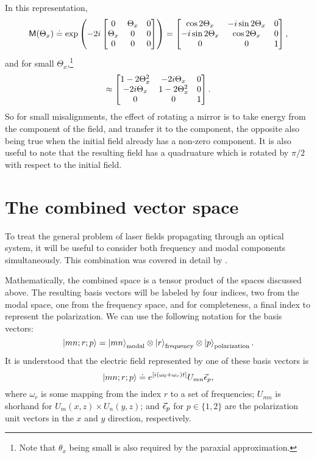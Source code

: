 In this representation, 
\begin{equation}
\mathsf{M}(\Theta_x) \doteq \exp \left( -2i 
\left[\begin{matrix} 
0 & \Theta_x & 0 \\
\Theta_x & 0 & 0 \\
0 & 0 & 0 
\end{matrix}\right]
\right)
=
\left[\begin{matrix}
\cos {2\Theta_x} & -i\sin{2\Theta_x}& 0 \\
-i\sin {2\Theta_x} & \cos{2\Theta_x}& 0 \\
0 & 0 & 1 \\
\end{matrix}\right] ,
\end{equation}
and for small $\Theta_x$,\footnote{Note that $\theta_x$ being small is also required by the paraxial approximation.}
\[
\approx
\left[\begin{matrix}
1-2\Theta_x^2 & -2i\Theta_x& 0 \\
-2i\Theta_x & 1-2\Theta_x^2& 0 \\
0 & 0 & 1 \\
\end{matrix}\right] .
\]
So for small misalignments, the effect of rotating a mirror is to take energy from the  component of the field, and transfer it to the  component, the opposite also being true when the initial field already has a non-zero  component. %
It is also useful to note that the resulting  field has a quadruature which is rotated by $\pi/2$ with respect to the initial  field.

\section{The combined vector space}
To treat the general problem of laser fields propagating through an optical system, it will be useful to consider both frequency and modal components simultaneously. %
This combination was covered in detail by \citet{Sigg:00}.

Mathematically, the combined space is a tensor product of the spaces discussed above. %
The resulting basis vectors will be labeled by four indices, two from the modal space, one from the frequency space, and for completeness, a final index to represent the polarization. %
We can use the following notation for the basis vectors:
\begin{equation}
\left| mn;r;p \right>=\left| mn \right>_{\text{modal}}\otimes\left| r \right>_{\text{frequency}}\otimes\left| p \right>_{\text{polarization}}.
\end{equation}
It is understood that the electric field represented by one of these basis vectors is
\[
\left| mn;r;p \right> \doteq e^{\left[ i\left( \omega_0+\omega_r\right)t\right]} U_{mn}\vec{\epsilon}_p,
\]
where $\omega_r$ is some mapping from the index $r$ to a set of frequencies; $U_{mn}$ is shorhand for $U_m(x,z)\times U_n(y,z)$; and $\vec{\epsilon}_p$ for $p\in \{1,2\}$ are the polarization unit vectors in the $x$ and $y$ direction, respectively.

